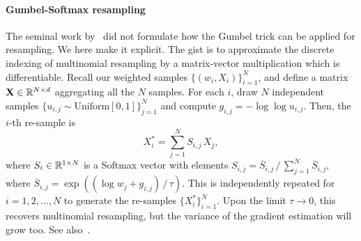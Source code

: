\documentclass{article}
\begin{document}
\paragraph{Gumbel-Softmax resampling} The seminal work by~\citet{Jang2017categorical} did not formulate how the Gumbel trick can be applied for resampling. 
We here make it explicit. 
The gist is to approximate the discrete indexing of multinomial resampling by a matrix-vector multiplication which is differentiable. 
Recall our weighted samples $\lbrace (w_i, X_i) \rbrace_{i=1}^N$, and define a matrix $\cu{X} \in\R^{N \times d}$ aggregating all the $N$ samples. 
For each $i$, draw $N$ independent samples $\lbrace u_{i, j} \sim \mathrm{Uniform}[0, 1] \rbrace_{j=1}^N$ and compute $g_{i, j} = -\log\log u_{i, j}$.
Then, the $i$-th re-sample is
%
\begin{equation*}
    X^*_i = \sum_{j=1}^N S_{i, j} \, X_j, 
\end{equation*}
%
where $S_i\in\mathbb{R}^{1 \times N}$ is a Softmax vector with elements $S_{i, j} = \overline{S}_{i, j} \, / \, \sum_{j=1}^N \overline{S}_{i, j}$, where $\overline{S}_{i, j} = \exp((\log w_j + g_{i, j}) \, / \, \tau)$. 
This is independently repeated for $i=1,2,\ldots, N$ to generate the re-samples $\lbrace X^*_i \rbrace_{i=1}^N$. 
Upon the limit $\tau \to 0$, this recovers multinomial resampling, but the variance of the gradient estimation will grow too. 
See also~\citet{Rosato2022}. 
\end{document}
